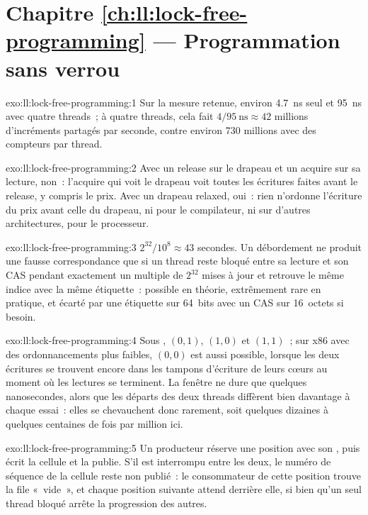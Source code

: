 \section*{Chapitre \ref{ch:ll:lock-free-programming} --- Programmation sans verrou}

\begin{solution}{exo:ll:lock-free-programming:1}
Sur la mesure retenue, environ \qty{4.7}{\nano\second} seul et \qty{95}{\nano\second} avec quatre threads~; à quatre
threads, cela fait $4/\qty{95}{\nano\second} \approx 42$ millions d'incréments partagés par seconde, contre environ 730 millions avec
des compteurs par thread.
\end{solution}

\begin{solution}{exo:ll:lock-free-programming:2}
Avec un release sur le drapeau et un acquire sur sa lecture, non~: l'acquire qui voit le drapeau voit toutes les écritures faites avant le release,
y compris le prix. Avec un drapeau relaxed, oui~: rien n'ordonne l'écriture du prix avant celle du drapeau, ni pour le compilateur, ni
sur d'autres architectures, pour le processeur.
\end{solution}

\begin{solution}{exo:ll:lock-free-programming:3}
$2^{32}/10^8 \approx 43$ secondes. Un débordement ne produit une fausse correspondance que si un thread reste bloqué entre sa lecture et son CAS
pendant exactement un multiple de $2^{32}$ mises à jour et retrouve le même indice avec la même étiquette~: possible en théorie, extrêmement rare
en pratique, et écarté par une étiquette sur 64~bits avec un CAS sur 16~octets si besoin.
\end{solution}

\begin{solution}{exo:ll:lock-free-programming:4}
Sous , $(0,1)$, $(1,0)$ et $(1,1)$~; sur x86 avec des ordonnancements plus faibles, $(0,0)$ est aussi possible, lorsque les deux écritures
se trouvent encore dans les tampons d'écriture de leurs cœurs au moment où les lectures se terminent. La fenêtre ne dure que quelques nanosecondes, alors que les départs des deux threads
diffèrent bien davantage à chaque essai~: elles se chevauchent donc rarement, soit quelques dizaines à quelques centaines de fois par million ici.
\end{solution}

\begin{solution}{exo:ll:lock-free-programming:5}
Un producteur réserve une position avec son , puis écrit la cellule et la publie. S'il est interrompu entre les deux, le numéro de séquence de la cellule
reste non publié~: le consommateur de cette position trouve la file «~vide~», et chaque position suivante attend derrière elle, si bien
qu'un seul thread bloqué arrête la progression des autres.
\end{solution}

